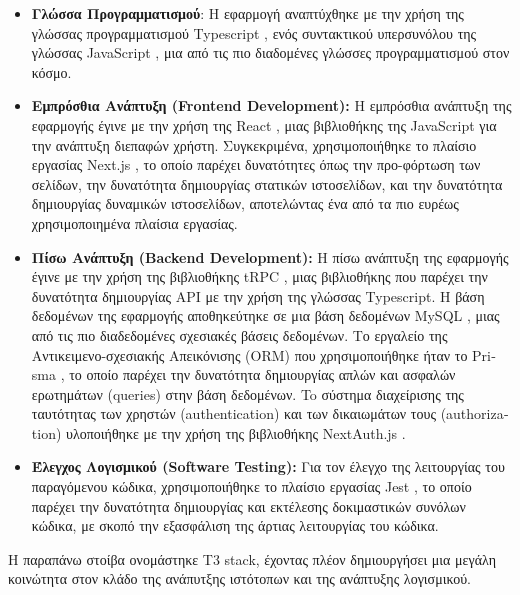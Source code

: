 \begin{itemize}
\item
  \textbf{Γλώσσα Προγραμματισμού}: Η εφαρμογή αναπτύχθηκε με την χρήση
  της γλώσσας προγραμματισμού \textlatin{Typescript} \cite{typescript},
  ενός συντακτικού υπερσυνόλου της γλώσσας \textlatin{JavaScript}
  \cite{javascript}, μια από τις πιο διαδομένες γλώσσες προγραμματισμού
  στον κόσμο. \cite{tiobe, languagechart}
\item
  \textbf{Εμπρόσθια Ανάπτυξη (\textlatin{Frontend Development}):} Η
  εμπρόσθια ανάπτυξη της εφαρμογής έγινε με την χρήση της
  \textlatin{React} \cite{react}, μιας βιβλιοθήκης της
  \textlatin{JavaScript} για την ανάπτυξη διεπαφών χρήστη. Συγκεκριμένα,
  χρησιμοποιήθηκε το πλαίσιο εργασίας \textlatin{Next.js} \cite{nextjs},
  το οποίο παρέχει δυνατότητες όπως την προ-φόρτωση των σελίδων, την
  δυνατότητα δημιουργίας στατικών ιστοσελίδων, και την δυνατότητα
  δημιουργίας δυναμικών ιστοσελίδων, αποτελώντας ένα από τα πιο ευρέως
  χρησιμοποιημένα πλαίσια εργασίας.
\item
  \textbf{Πίσω Ανάπτυξη (\textlatin{Backend Development}):} Η πίσω
  ανάπτυξη της εφαρμογής έγινε με την χρήση της βιβλιοθήκης
  \textlatin{tRPC} \cite{trpc}, μιας βιβλιοθήκης που παρέχει την
  δυνατότητα δημιουργίας \textlatin{API} με την χρήση της γλώσσας
  \textlatin{Typescript}. Η βάση δεδομένων της εφαρμογής αποθηκεύτηκε σε
  μια βάση δεδομένων \textlatin{MySQL} \cite{mysql}, μιας από τις πιο
  διαδεδομένες σχεσιακές βάσεις δεδομένων. Tο εργαλείο της
  Αντικειμενο-σχεσιακής Απεικόνισης \textlatin{(ORM)} που
  χρησιμοποιήθηκε ήταν το \textlatin{Prisma} \cite{prisma}, το οποίο
  παρέχει την δυνατότητα δημιουργίας απλών και ασφαλών ερωτημάτων
  \textlatin{(queries)} στην βάση δεδομένων. To σύστημα διαχείρισης της
  ταυτότητας των χρηστών \textlatin{(authentication)} και των
  δικαιωμάτων τους \textlatin{(authorization)} υλοποιήθηκε με την χρήση
  της βιβλιοθήκης \textlatin{NextAuth.js} \cite{nextauth}.
\item
  \textbf{Έλεγχος Λογισμικού (\textlatin{Software Testing}):} Για τον
  έλεγχο της λειτουργίας του παραγόμενου κώδικα, χρησιμοποιήθηκε το
  πλαίσιο εργασίας \textlatin{Jest} \cite{jest}, το οποίο παρέχει την
  δυνατότητα δημιουργίας και εκτέλεσης δοκιμαστικών συνόλων κώδικα, με
  σκοπό την εξασφάλιση της άρτιας λειτουργίας του κώδικα.
  \cite{Jacobson1999,irena2008,swebok2004,miller1981,shaw1990}
\end{itemize}

Η παραπάνω στοίβα ονομάστηκε \textlatin{T3 stack}, έχοντας πλέον
δημιουργήσει μια μεγάλη κοινώτητα στον κλάδο της ανάπυτξης ιστότοπων και
της ανάπτυξης λογισμικού. \cite{t3repo}

